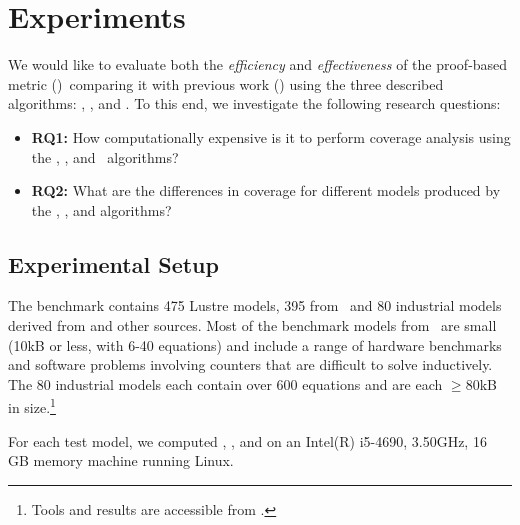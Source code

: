 \section{Experiments}
\label{sec:experiments}

We would like to evaluate both the {\em efficiency} and {\em
  effectiveness} of the proof-based metric (\ivccov)~comparing it with previous work (\nondetcov) using the three described algorithms: \ucalg, \ucbfalg, and \mustalg. To this end, we investigate the following research questions:
\begin{itemize}
    \item \textbf{RQ1:} How computationally expensive is it to perform coverage analysis using the \ucalg, \ucbfalg, and \mustalg\ algorithms?
    \item \textbf{RQ2:} What are the differences in coverage for different models produced by the \ucalg, \ucbfalg, and \mustalg algorithms?
\end{itemize}

\subsection{Experimental Setup}

The benchmark contains 475 Lustre models, 395 from~\cite{Hagen08:FMCAD} and 80 industrial models derived from \cite{hilt2013} and other sources.  Most of the benchmark models from~\cite{Hagen08:FMCAD} are small (10kB or less, with 6-40 equations) and include a range of hardware benchmarks and software problems involving counters that are difficult to solve inductively.
The 80 industrial models each contain over 600 equations and are each $\geq$80kB in size.\footnote{Tools and results are accessible from \cite{anoexpr}.}

For each test model, we computed \ucalg, \ucbfalg, and \mustalg  on an
Intel(R) i5-4690, 3.50GHz, 16 GB memory machine running Linux.




